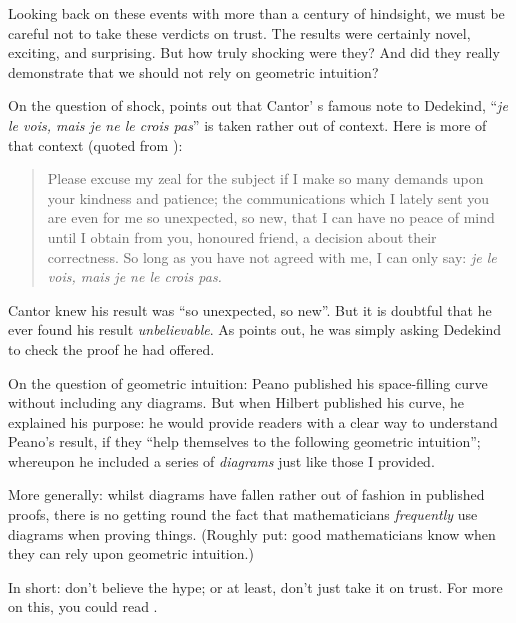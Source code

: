 \documentclass[../../../include/open-logic-section]{subfiles}
\begin{document}
Looking back on these events with more than a century of hindsight, we must be careful not to take these verdicts on trust. The results were certainly novel, exciting, and surprising. But how truly shocking were they? And did they really demonstrate that we should not rely on geometric intuition?

On the question of shock, \cite{Gouvea2011} points out that Cantor' s famous note to Dedekind, ``\emph{je le vois, mais je ne le crois pas}'' is taken rather out of context. Here is more of that context (quoted from \citeauthor{Gouvea2011}):
\begin{quote}
	Please excuse my zeal for the subject if I make so many demands upon your kindness and patience; the communications which I lately sent you are even for me so unexpected, so new, that I can have no peace of mind until I obtain from you, honoured friend, a decision about their correctness. So long as you have not agreed with me, I can only say: \emph{je le vois, mais je ne le crois pas.} 
\end{quote}
Cantor knew his result was ``so unexpected, so new''. But it is doubtful that he ever found his result \emph{unbelievable}. As \citeauthor{Gouvea2011} points out, he was simply asking Dedekind to check the proof he had offered. 

On the question of geometric intuition: Peano published his space-filling curve without including any diagrams. But when Hilbert published his curve, he explained his purpose: he would provide readers with a clear way to understand Peano's result, if they ``help themselves to the following geometric intuition''; whereupon he included a series of \emph{diagrams} just like those I provided. 

More generally: whilst diagrams have fallen rather out of fashion in published proofs, there is no getting round the fact that mathematicians \emph{frequently} use diagrams when proving things. (Roughly put: good mathematicians know when they can rely upon geometric intuition.)

In short: don't believe the hype; or at least, don't just take it on trust. For more on this, you could read \citeauthor{Giaquinto2007} \citeyear{Giaquinto2007}.
\end{document}
